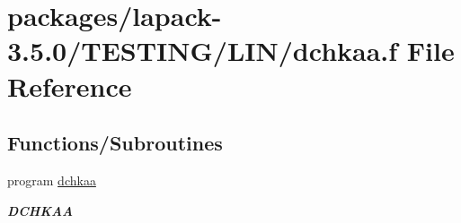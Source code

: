 \hypertarget{dchkaa_8f}{}\section{packages/lapack-\/3.5.0/\+T\+E\+S\+T\+I\+N\+G/\+L\+I\+N/dchkaa.f File Reference}
\label{dchkaa_8f}
\subsection*{Functions/\+Subroutines}
\begin{DoxyCompactItemize}
\item 
program \hyperlink{group__double__lin_gacc3a106614a533d1718bedc2b61b124b}{dchkaa}
\begin{DoxyCompactList}\small\item\em {\bfseries D\+C\+H\+K\+A\+A} \end{DoxyCompactList}\end{DoxyCompactItemize}
